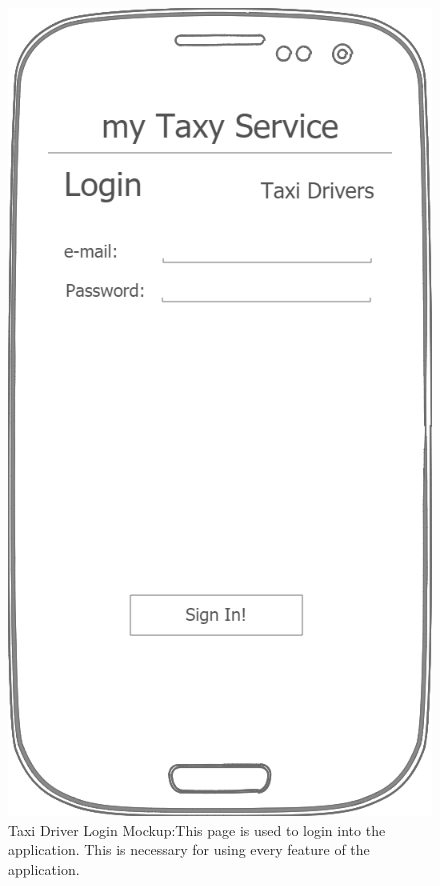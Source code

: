\documentclass[a4paper]{article}
\begin{document}
\begin{enumerate}[label=\bfseries G\arabic*:]
\begin{figure}[H]
\includegraphics[width=\mockupWidth]{Mockup-TaxiDriversLogin}
\centering
\caption[Taxi Driver Login Mockup]{Taxi Driver Login Mockup:\newline This page is used to login into the application. This is necessary for using every feature of the application.}
\label{fig:mockuptaxidriverlogin}
\end{figure}


\end{enumerate}
\end{document}
